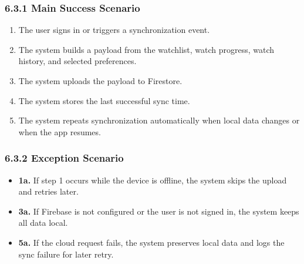 \subsubsection*{6.3.1 Main Success Scenario}
\begin{enumerate}[label=\arabic*.]
	\item The user signs in or triggers a synchronization event.
	\item The system builds a payload from the watchlist, watch progress, watch history, and selected preferences.
	\item The system uploads the payload to Firestore.
	\item The system stores the last successful sync time.
	\item The system repeats synchronization automatically when local data changes or when the app resumes.
\end{enumerate}

\subsubsection*{6.3.2 Exception Scenario}
\begin{itemize}
	\item \textbf{1a.} If step 1 occurs while the device is offline, the system skips the upload and retries later.
	\item \textbf{3a.} If Firebase is not configured or the user is not signed in, the system keeps all data local.
	\item \textbf{5a.} If the cloud request fails, the system preserves local data and logs the sync failure for later retry.
\end{itemize}